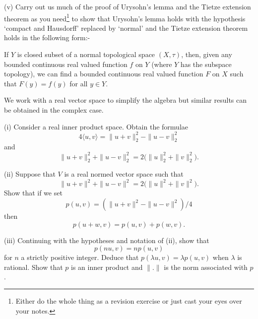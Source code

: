 \begin{exercise}

(v) Carry out us much of the proof of Urysohn's lemma
and the Tietze extension theorem as you need\footnote{Either
do the whole thing as a revision exercise or just cast your eyes
over your notes.}
to show that Urysohn's lemma holds with the hypothesis `compact and Hausdorff'
replaced by `normal' and the Tietze extension theorem
holds in the following form:-

If $Y$ is closed subset of a normal topological space
$(X,\tau)$, then, given any bounded continuous real valued
function $f$ on $Y$
(where $Y$ has the subspace topology), we can find
a bounded continuous real valued
function $F$ on $X$ such that $F(y)=f(y)$ for all $y\in Y$.
\end{exercise}
\begin{exercise}\label{E;parallelepiped}\label{C5.12} 
We work with a real 
vector space to simplify the algebra but similar
results can be obtained in the complex case.

(i) Consider a real inner product space. 
Obtain the formulae
\[4\langle u,v\rangle=\|u+v\|_{2}^{2}-\|u-v\|_{2}^{2}\]
and
\[\|u+v\|_{2}^{2}+\|u-v\|_{2}^{2}
=2\big(\|u\|_{2}^{2}+\|v\|_{2}^{2}\big).\]

(ii) Suppose that $V$ is a real normed vector space
such that
\[\|u+v\|^{2}+\|u-v\|^{2}=2\big(\|u\|^{2}+\|v\|^{2}\big).\]
Show that if we set
\[p(u,v)=(\|u+v\|^{2}-\|u-v\|^{2})/4\]
then
\[p(u+w,v)=p(u,v)+p(w,v).\]


(iii) Continuing with the hypotheses and notation
of (ii), show that 
\[p(nu,v)=np(u,v)\] 
for $n$ a strictly positive integer.
Deduce that $p(\lambda u,v)=\lambda p(u,v)$ when $\lambda$ is rational.
Show that $p$ is an inner product and $\|.\|$ is the norm associated 
with $p$.
\end{exercise}
